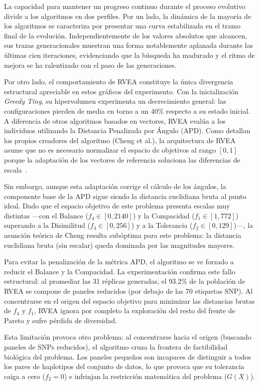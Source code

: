 La capacidad para mantener un progreso continuo durante el proceso evolutivo divide a los algoritmos en dos perfiles. Por un lado, la dinámica de la mayoría de los algoritmos se caracteriza por presentar una curva estabilizada en el tramo final de la evolución. Independientemente de los valores absolutos que alcancen, sus trazas generacionales muestran una forma notablemente aplanada durante las últimas cien iteraciones, evidenciando que la búsqueda ha madurado y el ritmo de mejora se ha ralentizado con el paso de las generaciones.

Por otro lado, el comportamiento de RVEA constituye la única divergencia estructural apreciable en estos gráficos del experimento. Con la inicialización \textit{Greedy Ting}, su hipervolumen experimenta un decrecimiento general: las configuraciones pierden de media en torno a un $40$\% respecto a su estado inicial. A diferencia de otros algoritmos basados en vectores, RVEA evalúa a los individuos utilizando la Distancia Penalizada por Ángulo (APD). Como detallan los propios creadores del algoritmo (Cheng et al.), la arquitectura de RVEA asume que no es necesario normalizar el espacio de objetivos al rango $[0, 1]$ porque la adaptación de los vectores de referencia soluciona las diferencias de escala~\cite{cheng2016reference}.

Sin embargo, aunque esta adaptación corrige el cálculo de los ángulos, la componente base de la APD sigue siendo la distancia euclidiana bruta al punto ideal. Dado que el espacio objetivo de este problema presenta escalas muy distintas —con el Balance ($f_4 \in [0, 2140]$) y la Compacidad ($f_1 \in [1, 772]$) superando a la Disimilitud ($f_3 \in [0, 256]$) y a la Tolerancia ($f_2 \in [0, 129]$)—, la asunción teórica de Cheng resulta subóptima para este problema: la distancia euclidiana bruta (sin escalar) queda dominada por las magnitudes mayores.

Para evitar la penalización de la métrica APD, el algoritmo se ve forzado a reducir el Balance y la Compacidad. La experimentación confirma este fallo estructural: al promediar las 31 réplicas generadas, el $93.2\%$ de la población de RVEA se compone de paneles reducidos (por debajo de las 70 etiquetas SNP). Al concentrarse en el origen del espacio objetivo para minimizar las distancias brutas de $f_4$ y $f_1$, RVEA ignora por completo la exploración del resto del frente de Pareto y sufre pérdida de diversidad.

Esta limitación provoca otro problema: al concentrarse hacia el origen (buscando paneles de SNPs reducidos), el algoritmo cruza la frontera de factibilidad biológica del problema. Los paneles pequeños son incapaces de distinguir a todos los pares de haplotipos del conjunto de datos, lo que provoca que su tolerancia caiga a cero ($f_2 = 0$) e infrinjan la restricción matemática del problema ($G(X)$).

